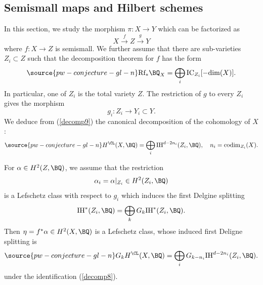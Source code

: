 \subsection{Semismall maps and Hilbert schemes}\label{Section3.4}
In this section, we study the morphism $\pi: X \to Y$ which can be factorized as
\[
X \xrightarrow{f} Z \xrightarrow{g} Y
\]
where $f: X \to Z$ is semismall. We further assume that there are sub-varieties $Z_i \subset Z$ such that the decomposition theorem for $f$ has the form
\begin{equation}\label{decomp9}
\source{pw-conjecture-gl-n}
\mathrm{Rf_\ast} \BQ_X = \bigoplus_i \mathrm{IC}_{Z_i}[-\mathrm{dim}(X)].
\end{equation}
In particular, one of $Z_i$ is the total variety $Z$. The restriction of $g$ to every $Z_i$ gives the morphism
\[
g_i: Z_i \to Y_i \subset Y.
\]
We deduce from (\ref{decomp9}) the canonical decomposition of the cohomology of $X$:
\begin{equation}\label{decomp8}
\source{pw-conjecture-gl-n}
H^\CL(X, \BQ) = \bigoplus_i \mathrm{IH}^{d-2n_i}(Z_i, \BQ), \quad n_i = \mathrm{codim}_{Z_i}(X).
\end{equation}

\begin{prop}
\notready\label{proposition3.5}
For $\alpha \in H^2(Z, \BQ)$, we assume that the restriction
\[
\alpha_i = \alpha|_{Z_i} \in H^2(Z_i, \BQ)
\]
is a Lefschetz class with respect to $g_i$ which induces the first Delgine splitting
\[
\mathrm{IH}^*(Z_i, \BQ) = \bigoplus_k G_k \mathrm{IH}^*(Z_i, \BQ).
\]
Then $\eta = f^*\alpha \in H^2(X, \BQ)$ is a Lefschetz class, whose induced first Deligne splitting is
\begin{equation}\label{decomp7}
\source{pw-conjecture-gl-n}
G_kH^\CL(X, \BQ) = \bigoplus_i G_{k-n_i}\mathrm{IH}^{d-2n_i}(Z_i, \BQ).
\end{equation}
under the identification (\ref{decomp8}).
\end{prop}

